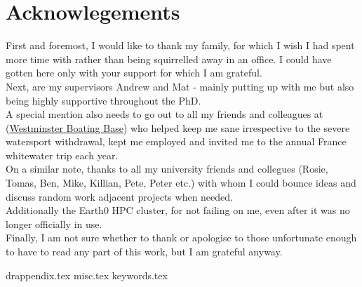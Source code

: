 \documentclass[twoside,openleft,reqno,a4paper,final]{book}
\newcommand{\chapterbib}{
\newpage


}
\begin{document}

    \chapter*{Acknowlegements}


\parbox{.75\textwidth}{
 First and foremost, I would like to thank my family, for which I wish I had spent more time with rather than being squirrelled away in an office. I could have gotten here only with your support for which I am grateful.\\

 Next, are my supervisors Andrew and Mat - mainly putting up with me but also being highly supportive throughout the PhD.\\

 A special mention also needs to go out to all my friends and colleagues at (\href{www.westminsterboatingbase.co.uk} {Westminster Boating Base}) who helped keep me sane irrespective to the severe watersport withdrawal, kept me employed and invited me to the annual France whitewater trip each year.\\

 On a similar note, thanks to all my university friends and collegues  (Rosie, Tomas, Ben, Mike, Killian, Pete, Peter etc.) with whom I could bounce ideas and discuss random work adjacent projects when needed.\\

 Additionally the Earth0 HPC cluster, for not failing on me, even after it was no longer officially in use.\\

 Finally, I am not sure whether to thank or apologise to those unfortunate enough to have to read any part of this work, but I am grateful anyway.\\

}



\tableofcontents
\newpage

\listoffigures
\listoftables
\newpage
\mainmatter




%
%  
% 
% 
%  
%  
 


\cleardoublepage\makeatletter\@openrightfalse\makeatother
\begin{appendices}
{drappendix.tex}
{misc.tex}
{keywords.tex}

\end{appendices}




\newpage
%
% 
% 
% 
\end{document}
